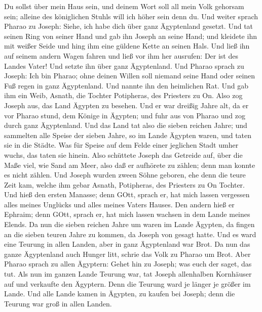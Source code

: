  Du sollst über mein Haus sein, und deinem Wort soll all
mein Volk gehorsam sein; alleine des königlichen Stuhls will ich höher
sein denn du.  Und weiter sprach Pharao zu Joseph: Siehe,
ich habe dich über ganz Ägyptenland gesetzt.  Und tat
seinen Ring von seiner Hand und gab ihn Joseph an seine Hand; und
kleidete ihn mit weißer Seide und hing ihm eine güldene Kette an seinen
Hals.  Und ließ ihn auf seinem andern Wagen fahren und ließ
vor ihm her ausrufen: Der ist des Landes Vater! Und setzte ihn über ganz
Ägyptenland.  Und Pharao sprach zu Joseph: Ich bin Pharao;
ohne deinen Willen soll niemand seine Hand oder seinen Fuß regen in ganz
Ägyptenland.  Und nannte ihn den heimlichen Rat. Und gab
ihm ein Weib, Asnath, die Tochter Potipheras, des Priesters zu On. Also
zog Joseph aus, das Land Ägypten zu besehen.  Und er war
dreißig Jahre alt, da er vor Pharao stund, dem Könige in Ägypten; und
fuhr aus von Pharao und zog durch ganz Ägyptenland.  Und
das Land tat also die sieben reichen Jahre;  und sammelten
alle Speise der sieben Jahre, so im Lande Ägypten waren, und taten sie
in die Städte. Was für Speise auf dem Felde einer jeglichen Stadt umher
wuchs, das taten sie hinein.  Also schüttete Joseph das
Getreide auf, über die Maße viel, wie Sand am Meer, also daß er
aufhörete zu zählen; denn man konnte es nicht zählen.  Und
Joseph wurden zween Söhne geboren, ehe denn die teure Zeit kam, welche
ihm gebar Asnath, Potipheras, des Priesters zu On Tochter. 
Und hieß den ersten Manasse; denn GOtt, sprach er, hat mich lassen
vergessen alles meines Unglücks und alles meines Vaters Hauses.
 Den andern hieß er Ephraim; denn GOtt, sprach er, hat mich
lassen wachsen in dem Lande meines Elends.  Da nun die
sieben reichen Jahre um waren im Lande Ägypten,  da fingen
an die sieben teuren Jahre zu kommen, da Joseph von gesagt hatte. Und es
ward eine Teurung in allen Landen, aber in ganz Ägyptenland war Brot.
 Da nun das ganze Ägyptenland auch Hunger litt, schrie das
Volk zu Pharao um Brot. Aber Pharao sprach zu allen Ägyptern: Gehet hin
zu Joseph; was euch der saget, das tut.  Als nun im ganzen
Lande Teurung war, tat Joseph allenhalben Kornhäuser auf und verkaufte
den Ägyptern. Denn die Teurung ward je länger je größer im Lande.
 Und alle Lande kamen in Ägypten, zu kaufen bei Joseph;
denn die Teurung war groß in allen Landen.

